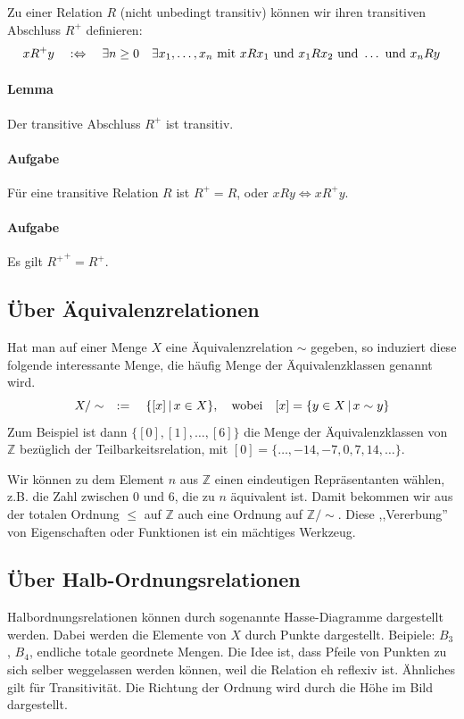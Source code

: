 \documentclass[a4paper,11pt,abstracton]{scrartcl}
\begin{document}
Zu einer Relation $R$ (nicht unbedingt transitiv) können wir ihren transitiven Abschluss $R^+$ definieren:
\begin{equation}
 x R^+ y \quad :\Leftrightarrow \quad \exists n \geq 0 \quad \exists x_1, \dots, x_n \textnormal{ mit } x R x_1 \textnormal{ und } x_1 R x_2 \textnormal{ und } \dots \textnormal{ und } x_n R y
\end{equation}
\paragraph{Lemma} Der transitive Abschluss $R^+$ ist transitiv.
\paragraph{Aufgabe} Für eine transitive Relation $R$ ist $R^+ = R$, oder $x R y \Leftrightarrow x R^+ y$.
\paragraph{Aufgabe} Es gilt ${R^+}^+ = R^+$.
\subsection{Über Äquivalenzrelationen}
Hat man auf einer Menge $X$ eine Äquivalenzrelation $\sim$ gegeben, so induziert diese folgende interessante Menge, die häufig Menge der Äquivalenzklassen genannt wird.
\begin{equation}
 X / \sim \quad := \quad \{ [x] \, | \, x \in X \}, \quad \textnormal{wobei} \quad [x] = \{ y \in X \, | \, x \sim y\}
\end{equation}
Zum Beispiel ist dann $\{[0], [1], \dots, [6] \}$ die Menge der Äquivalenzklassen von $\mathbb{Z}$ bezüglich der Teilbarkeitsrelation, mit $[0] = \{ \dots, -14, -7, 0, 7, 14, \dots \}$.

Wir können zu dem Element $n$ aus $\mathbb{Z}$ einen eindeutigen Repräsentanten wählen, z.B. die Zahl zwischen 0 und 6, die zu $n$ äquivalent ist. Damit bekommen wir aus der totalen Ordnung $\leq$ auf $\mathbb{Z}$ auch eine Ordnung auf $\mathbb{Z}/ \sim$. Diese ,,Vererbung'' von Eigenschaften oder Funktionen ist ein mächtiges Werkzeug.
\subsection{Über Halb-Ordnungsrelationen}
Halbordnungsrelationen können durch sogenannte Hasse-Diagramme dargestellt werden. Dabei werden die Elemente von $X$ durch Punkte dargestellt. Beipiele: $B_3$, $B_4$, endliche totale geordnete Mengen. Die Idee ist, dass Pfeile von Punkten zu sich selber weggelassen werden können, weil die Relation eh reflexiv ist. Ähnliches gilt für Transitivität. Die Richtung der Ordnung wird durch die Höhe im Bild dargestellt.
\end{document}
